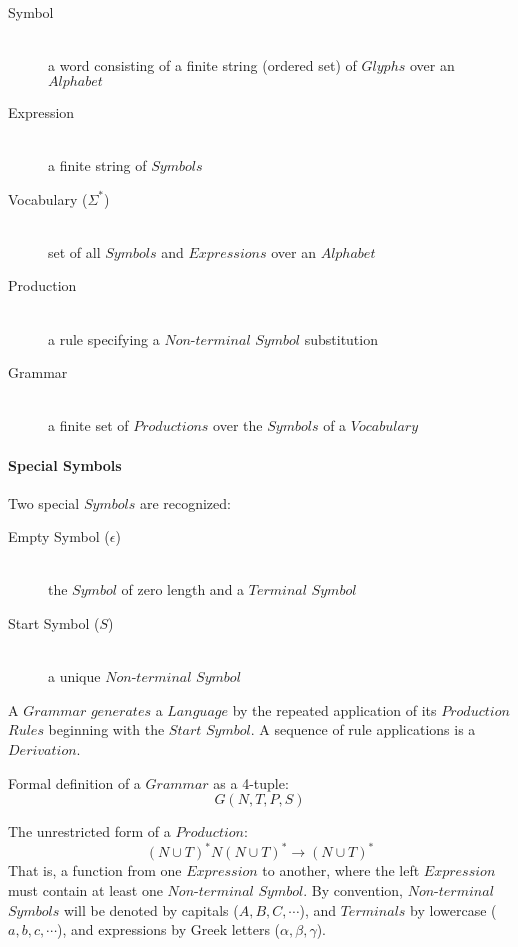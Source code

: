 \documentclass{article}
\begin{document}
    \begin{description}

    \item[Symbol] \hfill \\
    a word consisting of a finite string (ordered set) of $Glyphs$
    over an $Alphabet$

    \item[Expression] \hfill \\
    a finite string of $Symbols$

    \item[Vocabulary ($\Sigma^{*}$)] \hfill \\
    set of all $Symbols$ and $Expressions$ over an $Alphabet$

    \item[Production] \hfill \\
    a rule specifying a $Non$-$terminal$ $Symbol$ substitution

    \item[Grammar] \hfill \\
    a finite set of $Productions$ over the $Symbols$ of a $Vocabulary$

    \end{description}

\paragraph{Special Symbols}

Two special $Symbols$ are recognized:

    \begin{description}

    \item[Empty Symbol ($\epsilon$)] \hfill \\
    the $Symbol$ of zero length and a $Terminal$ $Symbol$

    \item[Start Symbol ($S$)] \hfill \\
    a unique $Non$-$terminal$ $Symbol$

    \end{description}

A $Grammar$ $generates$ a $Language$ by the repeated application
of its $Production$ $Rules$ beginning with the $Start$ $Symbol$. A
sequence of rule applications is a $Derivation$.

Formal definition of a $Grammar$ as a 4-tuple:
\[
    G(N,T,P,S)
\]

The unrestricted form of a $Production$:
\[
    (N \cup T)^*N(N \cup T)^* \rightarrow (N \cup T)^*
\]
That is, a function from one $Expression$ to another, where the left
$Expression$ must contain at least one $Non$-$terminal$ $Symbol$. By
convention, $Non$-$terminal$ $Symbols$ will be denoted by capitals
($A,B,C,\cdots$), and $Terminals$ by lowercase ($a,b,c,\cdots$), and
expressions by Greek letters ($\alpha,\beta,\gamma$).
\end{document}
